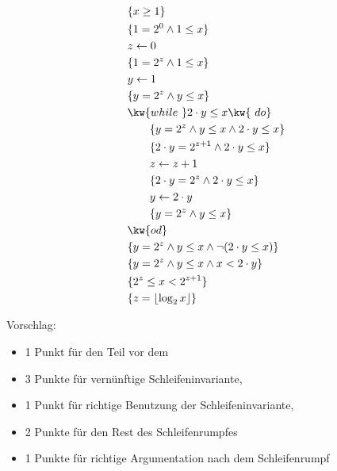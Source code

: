 \documentclass[12pt]{article}
\DeclarePairedDelimiter\floor{\lfloor}{\rfloor}
\begin{document}
\begin{loesung}
  \begin{align*}
    & \{ x \geq 1 \} \\
    & \{ 1=2^0 \land 1\leq x \}\\
    & z \gets 0 \\
    & \{ 1=2^z \land 1\leq x \}\\
    & y \gets 1 \\
    & \{ y=2^z \land y\leq x \}\\
    & \kw{while\ } 2 \cdot y \leq x \kw{\ do} \\
    & \qquad \{ y=2^z \land y\leq x \land 2\cdot y \leq x\}\\
    & \qquad \{ 2\cdot y=2^{z+1} \land 2\cdot y\leq x \}\\
    & \qquad z \gets z + 1 \\
    & \qquad \{ 2\cdot y=2^z \land 2\cdot y\leq x \}\\
    & \qquad y \gets 2 \cdot y \\
    & \qquad \{ y=2^z \land y\leq x \}\\
    & \kw{od} \\
    & \{ y=2^z \land y\leq x \land \lnot (2 \cdot y \leq x)\}\\
    & \{ y=2^z \land y\leq x \land x < 2 \cdot y \}\\
    & \{ 2^z \leq x < 2^{z + 1} \} \\
    & \{ z = \floor{\log_2 x} \}
  \end{align*}

  \begin{korrektur}
    Vorschlag: 
    \begin{itemize}
    \item 1 Punkt für den Teil vor dem 
    \item 3 Punkte für vernünftige Schleifeninvariante, 
    \item 1 Punkt für richtige Benutzung der Schleifeninvariante, 
    \item 2 Punkte für den Rest des Schleifenrumpfes
    \item 1 Punkte für richtige Argumentation nach dem Schleifenrumpf
    \end{itemize}
  \end{korrektur}

\end{loesung}

\end{document}
